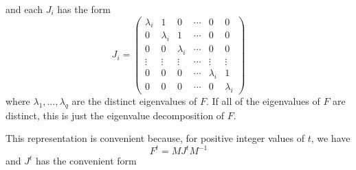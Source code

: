 \documentclass[12pt,fleqn]{article}
\begin{document}
and each $J_i$ has the form
\[
J_i =
\begin{pmatrix}
  \lambda_i & 1 & 0 & \cdots & 0 & 0 \\
  0 & \lambda_i & 1 & \cdots & 0 & 0 \\
  0 & 0 & \lambda_i & \cdots & 0 & 0 \\
  \vdots & \vdots & \vdots & \cdots & \vdots & \vdots \\
  0 & 0 & 0 & \cdots & \lambda_i & 1 \\
  0 & 0 & 0 & \cdots & 0 & \lambda_i
\end{pmatrix}
\]
where $\lambda_1,\dots,\lambda_q$ are the distinct eigenvalues of $F$.
If all of the eigenvalues of $F$ are distinct, this is just the
eigenvalue decomposition of $F$.

This representation is convenient because, for positive integer values
of $t$, we have
\[
F^t = M J^t M^{-1}
\]
and $J^t$ has the convenient form
\end{document}
